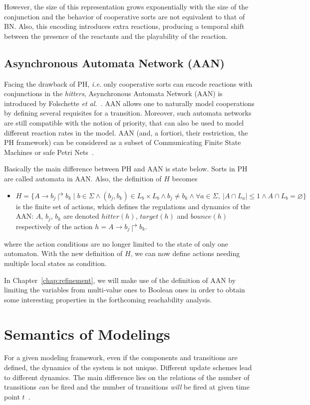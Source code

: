 However, the size of this representation grows exponentially with the size of the conjunction and the behavior of cooperative sorts are not equivalent to that of BN. 
Also, this encoding introduces extra reactions, producing a temporal shift between the presence of the reactants and the playability of the reaction.

\subsection{Asynchronous Automata Network (AAN)}\label{sec:AAN}
Facing the drawback of PH, \textit{i.e.} only cooperative sorts can encode reactions with conjunctions in the \textit{hitters}, Asynchronous Automata Network (AAN) is introduced by Folschette \textit{et al.}~\cite{folschette2015}.
AAN allows one to naturally model cooperations by defining several requisites for a transition.
Moreover, such automata networks are still compatible with the notion of priority, that can also be used to model different reaction rates in the model.
AAN (and, a fortiori, their restriction, the PH framework) can be considered as a subset of Communicating Finite State Machines or safe Petri Nets~\cite{pauleve2012process}.

Basically the main difference between PH and AAN is state below. 
Sorts in PH are called automata in AAN.
Also, the definition of $H$ becomes

\begin{itemize}
    \item $H=\{A\to b_j\Rsh b_k\mid b\in \Sigma \land (b_j,b_k)\in L_b\times L_b\land b_j\neq b_k\land \forall a \in \Sigma,\ |A\cap L_a|\leq 1 \land A\cap L_b=\varnothing\}$ is the finite set of actions, which defines the regulations and dynamics of the AAN: $A$, $b_j$, $b_k$ are denoted $hitter(h)$, $target(h)$ and $bounce(h)$ respectively of the action $h=A\to b_j\Rsh b_k$.
\end{itemize}

where the action conditions are no longer limited to the state of only one automaton.
With the new definition of $H$, we can now define actions needing multiple local states as condition.

In Chapter~\ref{chap:refinement}, we will make use of the definition of AAN by limiting the variables from multi-value ones to Boolean ones in order to obtain some interesting properties in the forthcoming reachability analysis.


\section{Semantics of Modelings}\label{sec:semantics}
For a given modeling framework, even if the components and transitions are defined, the dynamics of the system is not unique. 
Different update schemes lead to different dynamics.
The main difference lies on the relations of the number of transitions  \textit{can} be fired and the number of transitions  \textit{will} be fired at given time point $t$~\cite{ribeiro2018learning,chatain2018boolean}.

